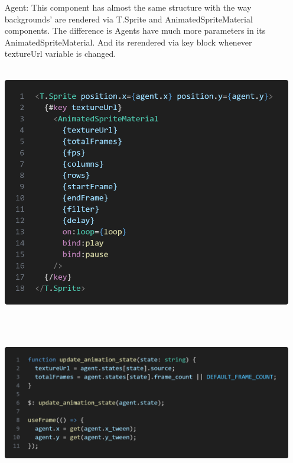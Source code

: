 \documentclass{article}
\begin{document}
\begin{itemize}
    \item[Agent:] This component has almost the same structure with the way backgrounds' are rendered via T.Sprite and AnimatedSpriteMaterial components. The difference is Agents have much more parameters in its AnimatedSpriteMaterial. And its rerendered via key block whenever textureUrl variable is changed.\\\\
    \begin{minipage}{\linewidth}
        \centering
        \includegraphics[width=1\textwidth]{agent-markup.png}
    \end{minipage}\\\\
    \begin{minipage}{\linewidth}
        \centering
        \includegraphics[width=1\textwidth]{agent-script.png}
    \end{minipage}\\\\


\end{itemize}
\end{document}
